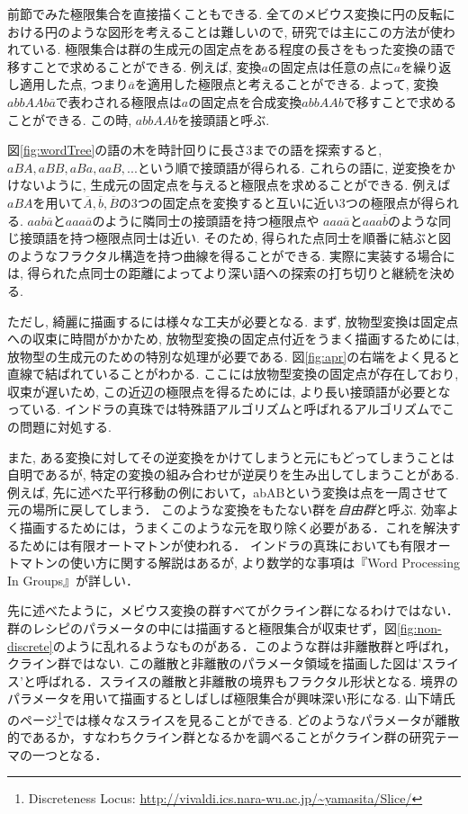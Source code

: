前節でみた極限集合を直接描くこともできる.
全てのメビウス変換に円の反転における円のような図形を考えることは難しいので, 研究では主にこの方法が使われている.
極限集合は群の生成元の固定点をある程度の長さをもった変換の語で移すことで求めることができる.
例えば, 変換$a$の固定点は任意の点に$a$を繰り返し適用した点, つまり$\overline{a}$を適用した極限点と考えることができる.
よって, 変換$abbAAb\overline{a}$で表わされる極限点は$a$の固定点を合成変換$abbAAb$で移すことで求めることができる.
この時, $abbAAb$を接頭語と呼ぶ.

図\ref{fig:wordTree}の語の木を時計回りに長さ3までの語を探索すると,$ aBA, aBB, aBa, aaB, ...$という順で接頭語が得られる.
これらの語に, 逆変換をかけないように, 生成元の固定点を与えると極限点を求めることができる.
例えば$aBA$を用いて$\overline{A}, \overline{b}, \overline{B}$の3つの固定点を変換すると互いに近い3つの極限点が得られる.
$aab\overline{a}$と$aaa\overline{a}$のように隣同士の接頭語を持つ極限点や $aaa\overline{a}$と$aaa\overline{b}$のような同じ接頭語を持つ極限点同士は近い.
そのため, 得られた点同士を順番に結ぶと図のようなフラクタル構造を持つ曲線を得ることができる.
実際に実装する場合には, 得られた点同士の距離によってより深い語への探索の打ち切りと継続を決める.

ただし, 綺麗に描画するには様々な工夫が必要となる.
まず, 放物型変換は固定点への収束に時間がかかため, 放物型変換の固定点付近をうまく描画するためには, 放物型の生成元のための特別な処理が必要である.
図\ref{fig:apr}の右端をよく見ると直線で結ばれていることがわかる.
ここには放物型変換の固定点が存在しており, 収束が遅いため, この近辺の極限点を得るためには, より長い接頭語が必要となっている.
インドラの真珠では特殊語アルゴリズムと呼ばれるアルゴリズムでこの問題に対処する.

また, ある変換に対してその逆変換をかけてしまうと元にもどってしまうことは自明であるが, 特定の変換の組み合わせが逆戻りを生み出してしまうことがある.
例えば, 先に述べた平行移動の例において，abABという変換は点を一周させて元の場所に戻してしまう．
このような変換をもたない群を\emph{自由群}と呼ぶ.
効率よく描画するためには，うまくこのような元を取り除く必要がある．これを解決するためには有限オートマトンが使われる．
インドラの真珠においても有限オートマトンの使い方に関する解説はあるが, より数学的な事項は『Word Processing In Groups』\cite{wordProcessing}が詳しい．

先に述べたように，メビウス変換の群すべてがクライン群になるわけではない．群のレシピのパラメータの中には描画すると極限集合が収束せず，図\ref{fig:non-discrete}のように乱れるようなものがある．このような群は非離散群と呼ばれ，クライン群ではない. この離散と非離散のパラメータ領域を描画した図は'スライス'と呼ばれる．スライスの離散と非離散の境界もフラクタル形状となる. 境界のパラメータを用いて描画するとしばしば極限集合が興味深い形になる.
山下靖氏のページ\footnote{Discreteness Locus: \url{http://vivaldi.ics.nara-wu.ac.jp/~yamasita/Slice/}}では様々なスライスを見ることができる. どのようなパラメータが離散的であるか，すなわちクライン群となるかを調べることがクライン群の研究テーマの一つとなる．



